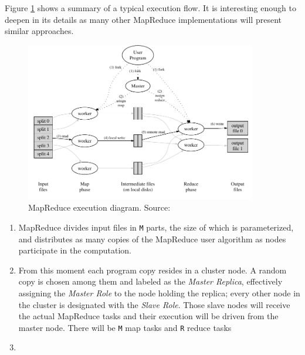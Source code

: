 Figure \ref{fig:exmapreduce} shows a summary of a typical execution flow. It is interesting enough to deepen in its details as many other MapReduce implementations will present similar approaches.

\begin{figure}[tbp]
\begin{center}
 \includegraphics[width=0.9\textwidth]{imagenes/006.pdf}
 \caption{MapReduce execution diagram. Source: \cite{googlemapreduce}}
 \label{fig:exmapreduce}
\end{center}
\end{figure}

\begin{enumerate}
 \item MapReduce divides input files in \texttt{M} parts, the size of which is parameterized, and distributes as many copies of the MapReduce user algorithm as nodes participate in the computation.
 \item From this moment each program copy resides in a cluster node. A random copy is chosen among them and labeled as the \emph{Master Replica}, effectively assigning the \emph{Master Role} to the node holding the replica; every other node in the cluster is designated with the \emph{Slave Role}. Those slave nodes will receive the actual MapReduce tasks and their execution will be driven from the master node. There will be \texttt{M} map tasks and \texttt{R} reduce tasks
 \item 
\end{enumerate}

